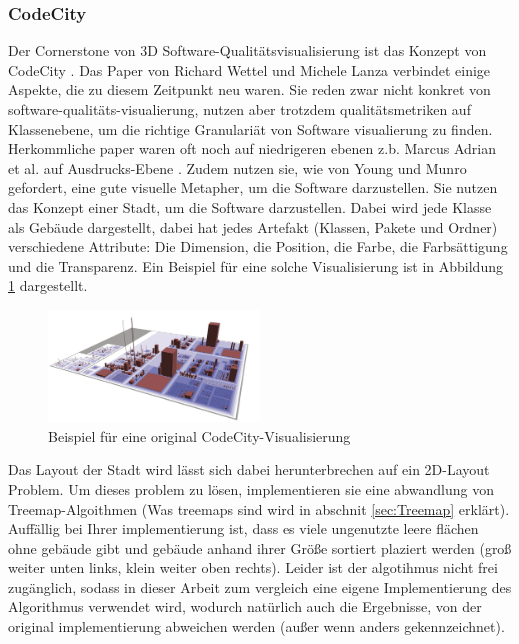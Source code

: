 \subsubsection{CodeCity} \label{sec:CodeCity}
Der Cornerstone von 3D Software-Qualitätsvisualisierung ist das Konzept von CodeCity \cite{codeCity1}. Das Paper von Richard Wettel und Michele Lanza verbindet einige Aspekte, die zu diesem Zeitpunkt neu waren. Sie reden zwar nicht konkret von software-qualitäts-visualierung, nutzen aber trotzdem qualitätsmetriken auf Klassenebene, um die richtige Granulariät von Software visualierung zu finden. Herkommliche paper waren oft noch auf niedrigeren ebenen z.b. Marcus Adrian et al. auf Ausdrucks-Ebene \cite{3dsoftwareMarcus}. Zudem nutzen sie, wie von Young und Munro \cite{visSoftwareVR} gefordert, eine gute visuelle Metapher, um die Software darzustellen. Sie nutzen das Konzept einer Stadt, um die Software darzustellen. Dabei wird jede Klasse als Gebäude dargestellt, dabei hat jedes Artefakt (Klassen, Pakete und Ordner) verschiedene Attribute: Die Dimension, die Position, die Farbe, die Farbsättigung und die Transparenz. Ein Beispiel für eine solche Visualisierung ist in Abbildung \ref{fig:codeCity} dargestellt.

\begin{figure}
    \centering
    \includegraphics[width=0.5\textwidth]{images/codeCityExample.png}
    \caption{Beispiel für eine original CodeCity-Visualisierung \cite[2]{codeCity1}}
    \label{fig:codeCity}
\end{figure}

Das Layout der Stadt wird lässt sich dabei herunterbrechen auf ein 2D-Layout Problem. Um dieses problem zu lösen, implementieren sie eine abwandlung von Treemap-Algoithmen (Was treemaps sind wird in abschnit \ref{sec:Treemap} erklärt). Auffällig bei Ihrer implementierung ist, dass es viele ungenutzte leere flächen ohne gebäude gibt und gebäude anhand ihrer Größe sortiert plaziert werden (groß weiter unten links, klein weiter oben rechts). Leider ist der algotihmus nicht frei zugänglich, sodass in dieser Arbeit zum vergleich eine eigene Implementierung des Algorithmus verwendet wird, wodurch natürlich auch die Ergebnisse, von der original implementierung abweichen werden (außer wenn anders gekennzeichnet).

